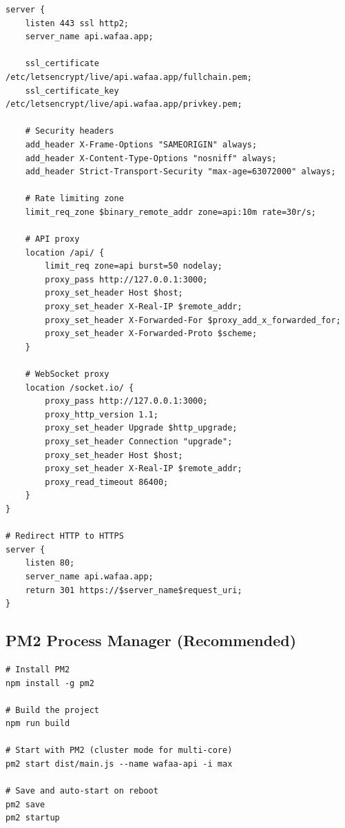 \documentclass[a4paper,11pt]{article}
\begin{document}
\begin{lstlisting}[language={}]
server {
    listen 443 ssl http2;
    server_name api.wafaa.app;

    ssl_certificate     /etc/letsencrypt/live/api.wafaa.app/fullchain.pem;
    ssl_certificate_key /etc/letsencrypt/live/api.wafaa.app/privkey.pem;

    # Security headers
    add_header X-Frame-Options "SAMEORIGIN" always;
    add_header X-Content-Type-Options "nosniff" always;
    add_header Strict-Transport-Security "max-age=63072000" always;

    # Rate limiting zone
    limit_req_zone $binary_remote_addr zone=api:10m rate=30r/s;

    # API proxy
    location /api/ {
        limit_req zone=api burst=50 nodelay;
        proxy_pass http://127.0.0.1:3000;
        proxy_set_header Host $host;
        proxy_set_header X-Real-IP $remote_addr;
        proxy_set_header X-Forwarded-For $proxy_add_x_forwarded_for;
        proxy_set_header X-Forwarded-Proto $scheme;
    }

    # WebSocket proxy
    location /socket.io/ {
        proxy_pass http://127.0.0.1:3000;
        proxy_http_version 1.1;
        proxy_set_header Upgrade $http_upgrade;
        proxy_set_header Connection "upgrade";
        proxy_set_header Host $host;
        proxy_set_header X-Real-IP $remote_addr;
        proxy_read_timeout 86400;
    }
}

# Redirect HTTP to HTTPS
server {
    listen 80;
    server_name api.wafaa.app;
    return 301 https://$server_name$request_uri;
}
\end{lstlisting}

\subsection{PM2 Process Manager (Recommended)}

\begin{lstlisting}[language={}]
# Install PM2
npm install -g pm2

# Build the project
npm run build

# Start with PM2 (cluster mode for multi-core)
pm2 start dist/main.js --name wafaa-api -i max

# Save and auto-start on reboot
pm2 save
pm2 startup
\end{lstlisting}

\end{document}
